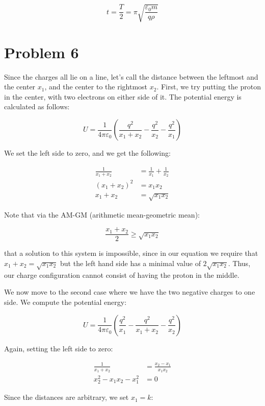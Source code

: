 \documentclass{article}
\theoremstyle{definition}
\numberwithin{equation}{section}
\numberwithin{definition}{section}
\begin{document}
    \[ t = \frac{T}{2} = \pi \sqrt{\frac{\varepsilon_0 m}{q\rho}}\]

    
    \section{Problem 6}

    Since the charges all lie on a line, let's call the distance between the leftmost and the center $x_1$, and the center to the rightmost $x_2$. First, we try putting the proton in the center, with two electrons on either side of it. The potential energy is calculated as follows:

    \[ U = \frac{1}{4\pi\varepsilon_0}\left(\frac{q^2}{x_1 + x_2} - \frac{q^2}{x_2} - \frac{q^2}{x_1}\right) \]

    We set the left side to zero, and we get the following:
    
    \begin{align*}
        \frac{1}{x_1 + x_2} &= \frac{1}{x_1} + \frac{1}{x_2}\\
        (x_1 + x_2)^2 &= x_1x_2\\
        x_1 + x_2 &= \sqrt{x_1x_2}
    \end{align*}
    
    Note that via the AM-GM (arithmetic mean-geometric mean):

    \[ \frac{x_1 + x_2}{2} \ge \sqrt{x_1x_2}\]

    that a solution to this system is impossible, since in our equation we require that $x_1 + x_2 = \sqrt{x_1x_2}$ but the left hand side has a minimal value of $2\sqrt{x_1x_2}$. Thus, our charge configuration cannot consist of having the proton in the middle. 
    
    \medskip

    We now move to the second case where we have the two negative charges to one side. We compute the potential energy:

    \[ U = \frac{1}{4\pi \varepsilon_0}\left(\frac{ q^2}{x_1} - \frac{q^2}{x_1 + x_2} - \frac{q^2}{x_2}\right) \] 

    Again, setting the left side to zero:

    \begin{align*}
        \frac{1}{x_1 + x_2} &= \frac{x_2 - x_1}{x_1x_2}\\
        x_2^2 - x_1x_2 - x_1^2 &= 0
    \end{align*}

    Since the distances are arbitrary, we set $x_1 = k$:
\end{document}
